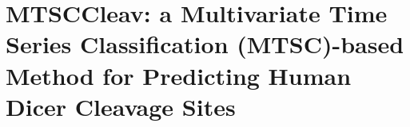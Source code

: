 \documentclass[twoside,openright,12pt]{report}
\theoremstyle{definition}
\newcommand{\firstpaper}{01-time-series-classification-cleavage-paper}
\begin{document}
\chapter{MTSCCleav: a Multivariate Time Series Classification (MTSC)-based Method for Predicting Human Dicer Cleavage Sites} \label{ch:mtsccleav} %








\cleardoublepage
{}
{} 

\cleardoublepage
{}
{}
\end{document}
